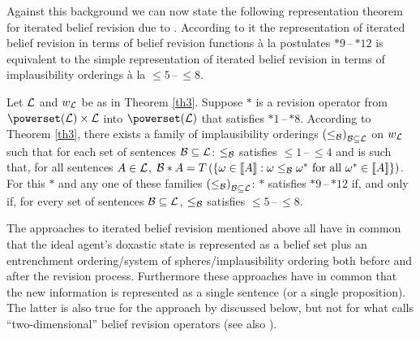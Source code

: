 Against this background we can now state the following representation theorem for iterated belief revision due to \citet{dp97}. According to it the representation of iterated belief revision in terms of belief revision functions \`{a} la postulates $*9$\,--\,$*12$ is equivalent to the simple representation of iterated belief revision in terms of implausibility orderings \`{a} la $\leq\!\!5$\,--\,$\leq\!\!8$.
\begin{theorem}\label{th4}
Let $\cal L$ and $w_{\cal L}$ be as in Theorem \ref{th3}. Suppose $*$ is a revision operator from $\powerset\!\left(\cal L\right)\times\cal L$ into $\powerset\!\left(\cal L\right)$ that satisfies $*1$\,--\,$*8$. According to Theorem \ref{th3}, there exists a family of implausibility orderings $\left(\leq_{\cal B}\right)_{\cal B\subseteq L}$ on $w_{\cal L}$ such that for each set of sentences $\cal B\subseteq L$: $\leq_{\cal B}$ satisfies $\leq\!\!1$\,--\,$\leq\!\!4$ and is such that, for all sentences $A\in\cal L$, $\begin{cal}B\end{cal}*A=T\left(\left\{\omega\in\llbracket A\rrbracket:\omega\leq_{\cal B}\omega^*\mbox{ for all }\omega^*\in\llbracket A\rrbracket\right\}\right)$. For this $*$ and any one of these families $\left(\leq_{\cal B}\right)_{\cal B\subseteq L}$: $*$ satisfies $*9$\,--\,$*12$ if, and only if, for every set of sentences $\cal B\subseteq L$, $\leq_{\cal B}$ satisfies $\leq\!\!5$\,--\,$\leq\!\!8$.
\end{theorem}
The approaches to iterated belief revision mentioned above all have in common that the ideal agent's doxastic state is represented as a belief set plus an entrenchment ordering/system of spheres/implausibility ordering both before and after the revision process. Furthermore these approaches have in common that the new information is represented as a single sentence (or a single proposition). The latter is also true for the approach by \citet{jt07} discussed below, but not for what \citet{r09} calls ``two-dimensional'' belief revision operators (see also \citealt{c97,fr04,r07}).

